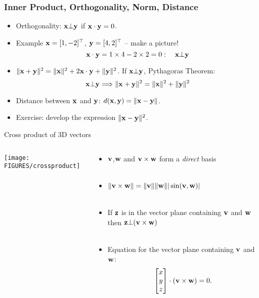 \documentclass[8pt,dvipsnames]{beamer}
\begin{document}
\begin{frame}
  \frametitle{Inner Product, Orthogonality, Norm, Distance}
  \begin{itemize}[<+->]
  \item Orthogonality: ${\bf x}\bot{\bf y}$ if ${\bf x}\cdot{\bf y} = 0$.
    \vfill
  \item Example ${\bf x} = [1, -2]^\top$, ${\bf y} = [4, 2]^\top$ -- make a picture!
    $$
    {\bf x}\cdot{\bf y} = 1\times 4 - 2\times 2 = 0:\quad {\bf x}\bot {\bf y} 
    $$
    \vfill
  \item $\|{\bf x} + {\bf y}\|^2 = \|{\bf x}\|^2 + 2{\bf x}\cdot{\bf y} + \|{\bf y}\|^2$. If ${\bf x}\bot{\bf y}$, Pythagoras Theorem:
    $$
    {\bf x}\bot{\bf y}\Longrightarrow \|{\bf x} + {\bf y}\|^2 = \|{\bf x}\|^2  + \|{\bf y}\|^2
    $$
    \vfill
  \item Distance between ${\bf x}$ and ${\bf y}$: $d({\bf x},{\bf y}) = \|{\bf x} - {\bf y}\|$.
    \vfill
    \item Exercise: develop the expression $\|{\bf x}-{\bf y}\|^2$.
   \end{itemize}
\end{frame}


\begin{frame}{Cross product of 3D vectors}
  \begin{columns}
    \begin{column}{0.5\textwidth}
       \texttt{[image: FIGURES/crossproduct]}
     \end{column}
     \begin{column}{0.5\textwidth}
       \begin{itemize}
       \item ${\bf v}$,${\bf w}$ and ${\bf v}\times{\bf w}$ form a \emph{direct} basis~\\~\\
         \vfill
       \item $\|{\bf v}\times{\bf w}\| = \|{\bf v}\|\|{\bf w}\||\sin({\bf v},{\bf w})|$~\\~\\
       \item If ${\bf z}$ is in the vector plane containing  ${\bf v}$ and ${\bf w}$ then ${\bf z} \bot({\bf v}\times{\bf w})$~\\~\\
       \item Equation for the vector plane containing ${\bf v}$ and ${\bf w}$:
         $$
         \begin{bmatrix}
           x\\y\\z
         \end{bmatrix}\cdot({\bf v}\times{\bf w}) = 0.
         $$
       \end{itemize}
     \end{column}
  \end{columns}
\end{frame}
\end{document}
